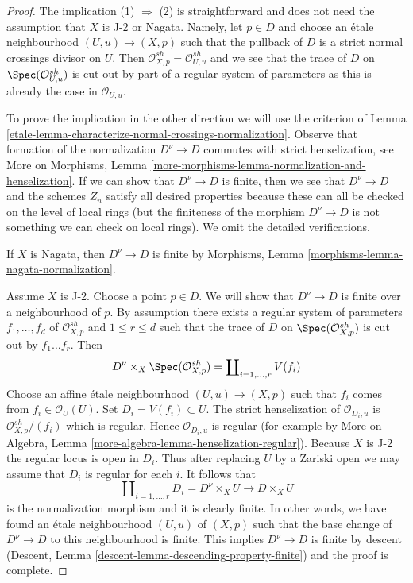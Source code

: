\begin{proof}

The implication (1) $\Rightarrow$ (2) is straightforward and
does not need the assumption that $X$ is J-2 or Nagata.
Namely, let $p \in D$ and choose an \'etale neighbourhood
$(U, u) \to (X, p)$ such that the pullback of $D$ is
a strict normal crossings divisor on $U$.
Then $\mathcal{O}_{X, p}^{sh} = \mathcal{O}_{U, u}^{sh}$
and we see that the trace of $D$ on $\Spec(\mathcal{O}_{U, u}^{sh})$
is cut out by part of a regular system of parameters
as this is already the case in $\mathcal{O}_{U, u}$.

\medskip\noindent
To prove the implication in the other direction
we will use the criterion of
Lemma \ref{etale-lemma-characterize-normal-crossings-normalization}.
Observe that formation of the normalization $D^\nu \to D$
commutes with strict henselization, see
More on Morphisms, Lemma
\ref{more-morphisms-lemma-normalization-and-henselization}.
If we can show that $D^\nu \to D$ is finite,
then we see that $D^\nu \to D$ and the schemes
$Z_n$ satisfy all desired properties because these
can all be checked on the level of local rings
(but the finiteness of the morphism $D^\nu \to D$
is not something we can check on local rings).
We omit the detailed verifications.

\medskip\noindent
If $X$ is Nagata, then $D^\nu \to D$ is finite by
Morphisms, Lemma \ref{morphisms-lemma-nagata-normalization}.

\medskip\noindent
Assume $X$ is J-2. Choose a point $p \in D$. We will show
that $D^\nu \to D$ is finite over a neighbourhood of $p$.
By assumption there exists a regular system of
parameters $f_1, \ldots, f_d$ of $\mathcal{O}_{X, p}^{sh}$
and $1 \leq r \leq d$ such that the trace of $D$ on
$\Spec(\mathcal{O}_{X, p}^{sh})$ is cut out by $f_1 \ldots f_r$.
Then
$$
D^\nu \times_X \Spec(\mathcal{O}_{X, p}^{sh}) =
\coprod\nolimits_{i = 1, \ldots, r} V(f_i)
$$
Choose an affine \'etale neighbourhood
$(U, u) \to (X, p)$ such that $f_i$ comes from
$f_i \in \mathcal{O}_U(U)$. Set $D_i = V(f_i) \subset U$.
The strict henselization of $\mathcal{O}_{D_i, u}$
is $\mathcal{O}_{X, p}^{sh}/(f_i)$ which is regular.
Hence $\mathcal{O}_{D_i, u}$ is regular (for example by
More on Algebra, Lemma \ref{more-algebra-lemma-henselization-regular}).
Because $X$ is J-2 the regular locus is open in $D_i$.
Thus after replacing $U$ by a Zariski open we may assume
that $D_i$ is regular for each $i$. It follows that
$$
\coprod\nolimits_{i = 1, \ldots, r} D_i = D^\nu \times_X U
\longrightarrow D \times_X U
$$
is the normalization morphism and it is clearly finite.
In other words, we have found
an \'etale neighbourhood $(U, u)$ of $(X, p)$ such that
the base change of $D^\nu \to D$ to this neighbourhood is finite.
This implies $D^\nu \to D$ is finite by descent
(Descent, Lemma \ref{descent-lemma-descending-property-finite})
and the proof is complete.
\end{proof}



